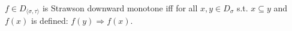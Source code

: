%
$f\in D_{\langle\sigma,\tau\rangle}$ is Strawson downward monotone iff for all $x,y\in D_\sigma$ s.t. $x\subseteq y$ and $f(x)$ is defined: $f(y)\Rightarrow f(x)$.%
